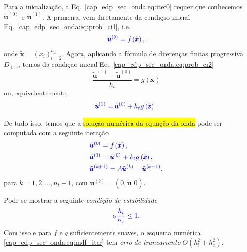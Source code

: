 Para a inicialização, a Eq.~\eqref{cap_edp_sec_onda:eq:iter0} requer que conhecemos $\tilde{\pmb{u}}^{(0)}$ e $\tilde{\pmb{u}}^{(1)}$. A primeira, vem diretamente da condição inicial Eq.~\eqref{cap_edp_sec_onda:eq:prob_ci1}, i.e.
\begin{equation}\label{cap_edp_sec_onda:eq:iter1}\color{blue}\tilde{\pmb{u}}^{(0)} = f\left(\tilde{\pmb{x}}\right),
\end{equation}
onde $\tilde{\pmb{x}} = \left(x_i\right)_{i=2}^{n_x}$. Agora, aplicando a \href{https://notaspedrok.com.br/notas/MatematicaNumericaII/cap_deriv_sec_df.html}{fórmula de diferenças finitas} progressiva $D_{+,h}$, temos da condição inicial Eq.~\eqref{cap_edp_sec_onda:eq:prob_ci2}
\begin{equation}
  \frac{\tilde{\pmb{u}}^{(1)} - \tilde{\pmb{u}}^{(0)}}{h_t} = g\left(\tilde{\pmb{x}}\right)
\end{equation}
ou, equivalentemente,
\begin{equation}\label{cap_edp_sec_onda:eq:iter2}\color{blue}\tilde{\pmb{u}}^{(1)} =  \tilde{\pmb{u}}^{(0)} + h_tg\left(\tilde{\pmb{x}}\right).
\end{equation}

De tudo isso, temos que a \hl{solução numérica da equação da onda} pode ser computada com a seguinte iteração
\begin{subequations}\label{cap_edp_sec_onda:eq:mdf_iter}\hleq
  \begin{align}
    &\tilde{\pmb{u}}^{(0)} = f\left(\tilde{\pmb{x}}\right),\\
    &\tilde{\pmb{u}}^{(1)} =  \tilde{\pmb{u}}^{(0)} + h_tg\left(\tilde{\pmb{x}}\right),\label{cap_edp_sec_onda:eq:p1}\\
    &\tilde{\pmb{u}}^{(k+1)} = A\tilde{\pmb{u}}^{(k)} - \tilde{\pmb{u}}^{(k-1)},
  \end{align}
\end{subequations}
para $k = 1, 2, \dotsc, n_t-1$, com $\pmb{u}^{(k)} = \left(0, \tilde{\pmb{u}}, 0\right)$.

\begin{obs}\label{cap_edp_sec_onda:obs:conds}
  Pode-se mostrar a seguinte \emph{condição de estabilidade} \cite[p. 487]{Isaacson1994a}
  \begin{equation}\color{blue}\alpha \frac{h_t}{h_x} \leq 1.
  \end{equation}
  Com isso e para $f$ e $g$ suficientemente suaves, o esquema numérica \eqref{cap_edp_sec_onda:eq:mdf_iter} tem \emph{erro de truncamento} $O(h_t^2 + h_x^2)$.
\end{obs}

